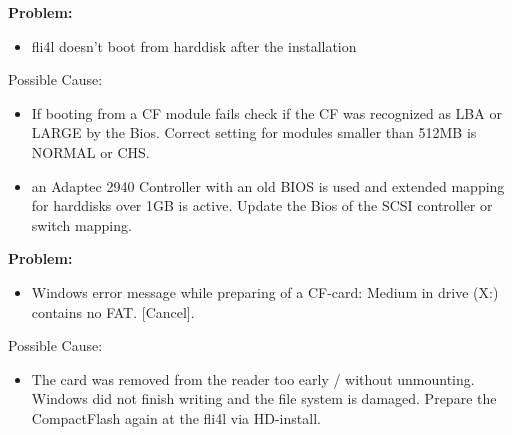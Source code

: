     \textbf{Problem:}
    \begin{itemize}
    \item fli4l doesn't boot from harddisk after the installation
    \end{itemize}
    
    Possible Cause:
    \begin{itemize}
    \item If booting from a CF module fails check if the CF was recognized as LBA 
    or LARGE by the Bios. Correct setting for modules smaller than 512MB is 
    NORMAL or CHS.
    \item an Adaptec 2940 Controller with an old BIOS is used and extended 
    mapping for harddisks over 1GB is active. Update the Bios of the SCSI controller 
    or switch mapping.\\
    \end{itemize}

    \textbf{Problem:}
    \begin{itemize}
    \item Windows error message while preparing of a CF-card: \glqq{}Medium in drive (X:) 
    contains no FAT. [Cancel]\grqq{}.
    \end{itemize}

    Possible Cause:
    \begin{itemize}
    \item The card was removed from the reader too early / without unmounting.
    Windows did not finish writing and the file system is damaged. Prepare the CompactFlash again 
    at the fli4l via HD-install.
    \end{itemize}
